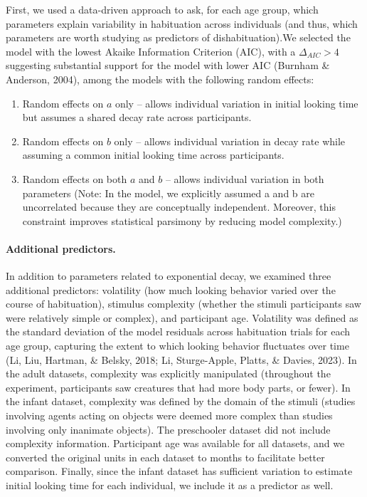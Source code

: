\documentclass[10pt, letterpaper]{article}
\begin{document}
First, we used a data-driven approach to ask, for each age group, which
parameters explain variability in habituation across individuals (and
thus, which parameters are worth studying as predictors of
dishabituation).We selected the model with the lowest Akaike Information
Criterion (AIC), with a \(\Delta_{AIC} > 4\) suggesting substantial
support for the model with lower AIC (Burnham \& Anderson, 2004), among
the models with the following random effects:

\begin{enumerate}
\def\labelenumi{\arabic{enumi}.}
\item
  Random effects on \(a\) only -- allows individual variation in initial
  looking time but assumes a shared decay rate across participants.
\item
  Random effects on \(b\) only -- allows individual variation in decay
  rate while assuming a common initial looking time across participants.
\item
  Random effects on both \(a\) and \(b\) -- allows individual variation
  in both parameters (Note: In the model, we explicitly assumed a and b
  are uncorrelated because they are conceptually independent. Moreover,
  this constraint improves statistical parsimony by reducing model
  complexity.)
\end{enumerate}

\hypertarget{additional-predictors.}{%
\paragraph{Additional predictors.}\label{additional-predictors.}}

In addition to parameters related to exponential decay, we examined
three additional predictors: volatility (how much looking behavior
varied over the course of habituation), stimulus complexity (whether the
stimuli participants saw were relatively simple or complex), and
participant age. Volatility was defined as the standard deviation of the
model residuals across habituation trials for each age group, capturing
the extent to which looking behavior fluctuates over time (Li, Liu,
Hartman, \& Belsky, 2018; Li, Sturge-Apple, Platts, \& Davies, 2023). In
the adult datasets, complexity was explicitly manipulated (throughout
the experiment, participants saw creatures that had more body parts, or
fewer). In the infant dataset, complexity was defined by the domain of
the stimuli (studies involving agents acting on objects were deemed more
complex than studies involving only inanimate objects). The preschooler
dataset did not include complexity information. Participant age was
available for all datasets, and we converted the original units in each
dataset to months to facilitate better comparison. Finally, since the
infant dataset has sufficient variation to estimate initial looking time
for each individual, we include it as a predictor as well.
\end{document}
